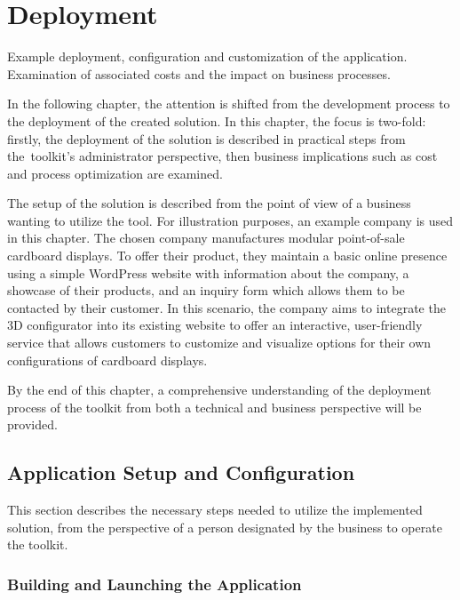 \chapter{Deployment}

\begin{chapterabstract}
    Example deployment, configuration and customization of the application. Examination of associated costs and the impact on business processes.
\end{chapterabstract}

In the following chapter, the attention is shifted from the development process to the deployment of the created solution. In this chapter, the focus is two-fold: firstly, the deployment of the solution is described in practical steps from the~toolkit's administrator perspective, then business implications such as cost and process optimization are examined.

The setup of the solution is described from the point of view of a business wanting to utilize the tool. For illustration purposes, an example company is used in this chapter. The chosen company manufactures modular point-of-sale cardboard displays. To offer their product, they maintain a basic online presence using a simple WordPress website with information about the company, a showcase of their products, and an inquiry form which allows them to be contacted by their customer. In this scenario, the company aims to integrate the 3D configurator into its existing website to offer an interactive, user-friendly service that allows customers to customize and visualize options for their own configurations of cardboard displays.

By the end of this chapter, a comprehensive understanding of the deployment process of the toolkit from both a technical and business perspective will be provided.


\section{Application Setup and Configuration}

This section describes the necessary steps needed to utilize the implemented solution, from the perspective of a person designated by the business to operate the toolkit.


\subsection{Building and Launching the Application}

